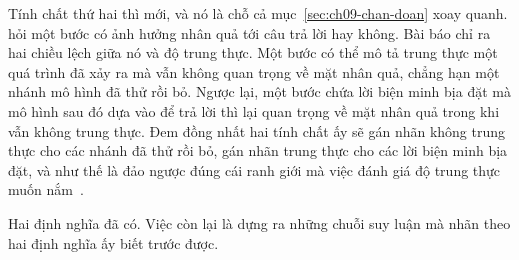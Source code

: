 %
Tính chất thứ hai thì mới, và nó là chỗ cả mục~\ref{sec:ch09-chan-doan} xoay
quanh.  hỏi một bước có ảnh hưởng nhân quả tới
câu trả lời hay không. Bài báo chỉ ra hai chiều lệch giữa nó và độ trung thực.
Một bước có thể mô tả trung thực một quá trình đã xảy ra mà vẫn không quan
trọng về mặt nhân quả, chẳng hạn một nhánh mô hình đã thử rồi bỏ. Ngược lại,
một bước chứa lời biện minh bịa đặt mà mô hình sau đó dựa vào để trả lời thì
lại quan trọng về mặt nhân quả trong khi vẫn không trung thực. Đem đồng nhất
hai tính chất ấy sẽ gán nhãn không trung thực cho các nhánh đã thử rồi bỏ, gán
nhãn trung thực cho các lời biện minh bịa đặt, và như thế là đảo ngược đúng
cái ranh giới mà việc đánh giá độ trung thực muốn nắm~\autocite{p21metrics}.

Hai định nghĩa đã có. Việc còn lại là dựng ra những chuỗi suy luận mà nhãn theo
hai định nghĩa ấy biết trước được.
